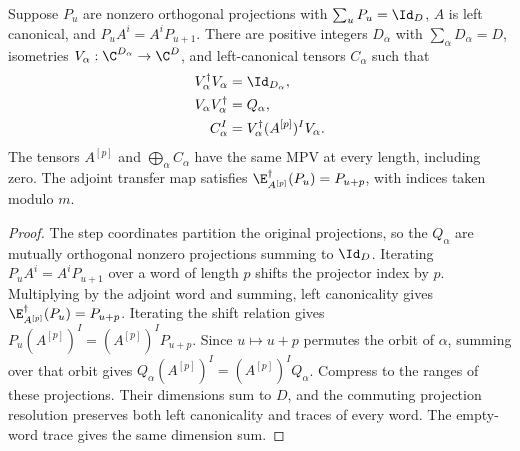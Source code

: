 \begin{lemma}
    \label{thm:periodic_step_orbit_compression}
    \leanok
    Suppose $P_u$ are nonzero orthogonal projections with $\sum_uP_u=\Id_D$,
    $A$ is left canonical, and $P_uA^i=A^iP_{u+1}$. There are positive integers
    $D_\alpha$ with $\sum_\alpha D_\alpha=D$, isometries
    $V_\alpha:\C^{D_\alpha}\to\C^D$, and left-canonical tensors $C_\alpha$
    such that
    \begin{align}
        V_\alpha^\dagger V_\alpha & =\Id_{D_\alpha}, \notag                      \\
        V_\alpha V_\alpha^\dagger & =Q_\alpha, \notag                            \\
        C_\alpha^I                & =V_\alpha^\dagger(A^{[p]})^IV_\alpha. \notag
    \end{align}
    The tensors $A^{[p]}$ and $\bigoplus_\alpha C_\alpha$ have the same MPV
    at every length, including zero. The adjoint transfer map satisfies
    $\E_{A^{[p]}}^\dagger(P_u)=P_{u+p}$, with indices taken modulo $m$.
\end{lemma}

\begin{proof}\leanok
    The step coordinates partition the original projections, so the $Q_\alpha$
    are mutually orthogonal nonzero projections summing to $\Id_D$.
    Iterating $P_uA^i=A^iP_{u+1}$ over a word of length $p$ shifts the
    projector index by $p$. Multiplying by the adjoint word and summing,
    left canonicality gives $\E_{A^{[p]}}^\dagger(P_u)=P_{u+p}$.
    Iterating the shift relation gives $P_u(A^{[p]})^I=(A^{[p]})^IP_{u+p}$.
    Since $u\mapsto u+p$ permutes the orbit of $\alpha$, summing over that
    orbit gives $Q_\alpha(A^{[p]})^I=(A^{[p]})^IQ_\alpha$.
    Compress to the ranges of these projections. Their dimensions sum to $D$,
    and the commuting projection resolution preserves both left canonicality
    and traces of every word. The empty-word trace gives the same dimension sum.
\end{proof}

